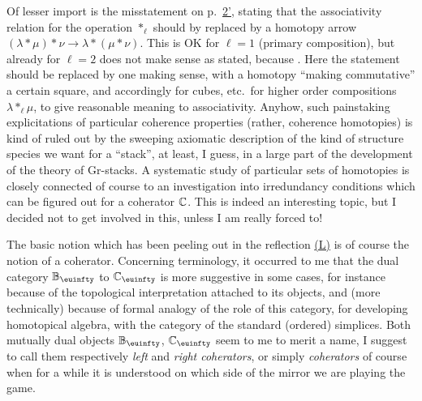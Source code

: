 Of lesser import is the misstatement on p.\ \hyperref[sec:2]{2'},
stating that the associativity relation for the operation $*_\ell$
should by replaced by a homotopy arrow
$(\lambda * \mu) * \nu \to \lambda * (\mu * \nu)$. This is OK for
$\ell=1$ (primary composition), but already for $\ell=2$ does not make
sense as stated, because . Here the
statement should be replaced by one making sense, with a homotopy
``making commutative'' a certain square, and accordingly for cubes,
etc.\ for higher order compositions $\lambda *_\ell \mu$, to give
reasonable meaning to associativity. Anyhow, such painstaking
explicitations of particular coherence properties (rather, coherence
homotopies) is kind of ruled out by the sweeping axiomatic description
of the kind of structure species we want for a ``stack'', at least, I
guess, in a large part of the development of the theory of
Gr-stacks. A systematic study of particular sets of homotopies is
closely connected of course to an investigation into irredundancy
conditions which can be figured out for a coherator ${\mathbb{C}}$. This is
indeed an interesting topic, but I decided not to get involved in
this, unless I am really forced to!

The basic notion which has been peeling out in the reflection \hyperref[ch:I]{(L)} is
of course the notion of a coherator. Concerning terminology, it
occurred to me that the dual category $\bB_\oo$ to $\bC_\oo$ is
more suggestive in some cases, for instance because of the topological
interpretation attached to its objects, and (more technically) because
of formal analogy of the role of this category, for developing
homotopical algebra, with the category of the standard (ordered)
simplices. Both mutually dual objects $\bB_\oo$, $\bC_\oo$ seem
to me to merit a name, I suggest to call them respectively \emph{left}
and \emph{right coherators}, or simply \emph{coherators} of course
when for a while it is understood on which side of the mirror we are
playing the game.

